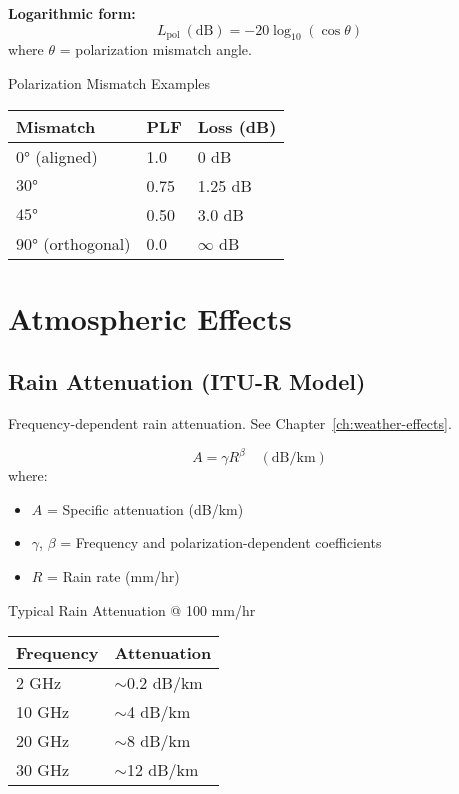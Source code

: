 \textbf{Logarithmic form:}
\begin{equation}
L_{\text{pol}}\ (\text{dB}) = -20\log_{10}(\cos\theta)
\label{eq:plf-db}
\end{equation}
where $\theta$ = polarization mismatch angle.

\begin{calloutbox}{Polarization Mismatch Examples}
\begin{tabular}{@{}lll@{}}
\toprule
Mismatch & PLF & Loss (dB) \\
\midrule
$0°$ (aligned) & 1.0 & 0 dB \\
$30°$ & 0.75 & 1.25 dB \\
$45°$ & 0.50 & 3.0 dB \\
$90°$ (orthogonal) & 0.0 & $\infty$ dB \\
\bottomrule
\end{tabular}
\end{calloutbox}

\section{Atmospheric Effects}
\label{sec:atmospheric-effects}

\subsection{Rain Attenuation (ITU-R Model)}
\label{sec:rain-attenuation}

Frequency-dependent rain attenuation. See Chapter~\ref{ch:weather-effects}.

\begin{equation}
A = \gamma R^{\beta} \quad (\text{dB/km})
\label{eq:rain-attenuation}
\end{equation}
where:
\begin{itemize}
\item $A$ = Specific attenuation (dB/km)
\item $\gamma$, $\beta$ = Frequency and polarization-dependent coefficients
\item $R$ = Rain rate (mm/hr)
\end{itemize}

\begin{calloutbox}{Typical Rain Attenuation @ 100 mm/hr}
\begin{tabular}{@{}ll@{}}
\toprule
Frequency & Attenuation \\
\midrule
2 GHz & $\sim$0.2 dB/km \\
10 GHz & $\sim$4 dB/km \\
20 GHz & $\sim$8 dB/km \\
30 GHz & $\sim$12 dB/km \\
\bottomrule
\end{tabular}
\end{calloutbox}

